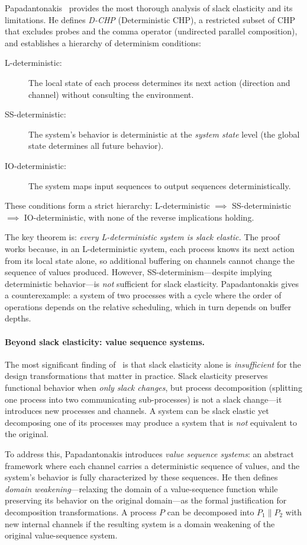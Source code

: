 \documentclass[11pt]{article}
\begin{document}
Papadantonakis~\cite{papadantonakis2002} provides the most thorough
analysis of slack elasticity and its limitations.  He defines
\emph{D-CHP} (Deterministic CHP), a restricted subset of CHP that
excludes probes and the comma operator (undirected parallel
composition), and establishes a hierarchy of determinism conditions:
\begin{description}
\item[L-deterministic:] The local state of each process determines
  its next action (direction and channel) without consulting the
  environment.
\item[SS-deterministic:] The system's behavior is deterministic at
  the \emph{system state} level (the global state determines all
  future behavior).
\item[IO-deterministic:] The system maps input sequences to output
  sequences deterministically.
\end{description}
These conditions form a strict hierarchy:
L-deterministic $\implies$ SS-deterministic $\implies$ IO-deterministic,
with none of the reverse implications holding.

The key theorem is: \emph{every L-deterministic system is slack elastic.}
The proof works because, in an L-deterministic system, each process
knows its next action from its local state alone, so additional
buffering on channels cannot change the sequence of values produced.
However, SS-determinism---despite implying deterministic
behavior---is \emph{not} sufficient for slack elasticity.
Papadantonakis gives a counterexample: a system of two processes with
a cycle where the order of operations depends on the relative
scheduling, which in turn depends on buffer depths.

\paragraph{Beyond slack elasticity: value sequence systems.}
The most significant finding of~\cite{papadantonakis2002} is that
slack elasticity alone is \emph{insufficient} for the design
transformations that matter in practice.  Slack elasticity preserves
functional behavior when \emph{only slack changes}, but process
decomposition (splitting one process into two communicating
sub-processes) is not a slack change---it introduces new processes
and channels.  A system can be slack elastic yet decomposing one
of its processes may produce a system that is \emph{not} equivalent
to the original.

To address this, Papadantonakis introduces \emph{value sequence
systems}: an abstract framework where each channel carries a
deterministic sequence of values, and the system's behavior is
fully characterized by these sequences.  He then defines
\emph{domain weakening}---relaxing the domain of a value-sequence
function while preserving its behavior on the original domain---as
the formal justification for decomposition transformations.  A
process $P$ can be decomposed into $P_1 \| P_2$ with new internal
channels if the resulting system is a domain weakening of the
original value-sequence system.
\end{document}
